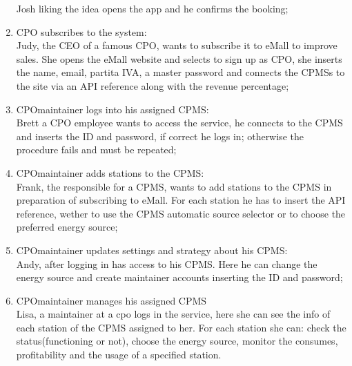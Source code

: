 \begin{enumerate}[label=\textbf{S\arabic*}]
            Josh liking the idea opens the app and he confirms the booking;\label{SCE:user-gets-suggestions}
      \item \ac{CPO} subscribes to the system:\\
            Judy, the CEO of a famous \ac{CPO}, wants to subscribe it to \ac{eMall} to improve sales.
            She opens the eMall website and selects to sign up as \ac{CPO}, she inserts the name, email, \gls{partita IVA}, a master password and connects the \acp{CPMS} to the site via an \ac{API} reference along with the revenue percentage;\label{SCE:cpo-signs-up}
      \item \ac{CPO}maintainer logs into his assigned \ac{CPMS}:\\
            Brett a \ac{CPO} employee wants to access the service, he connects to the \ac{CPMS} and inserts the ID
            and password, if correct he logs in; otherwise the procedure fails and must be repeated;\label{SCE:cpomaintainer-logs-in}
      \item \ac{CPO}maintainer adds stations to the \ac{CPMS}:\\
            Frank, the responsible for a \ac{CPMS}, wants to add stations to the \ac{CPMS} in preparation of subscribing to eMall. For each station he has to insert the \ac{API} reference,
            wether to use the \ac{CPMS} automatic source selector or to choose the preferred energy source;\label{SCE:cpomaintainer-adds-stations}
      \item \ac{CPO}maintainer updates settings and strategy about his \ac{CPMS}:\\
            Andy, after logging in has access to his \ac{CPMS}.
            Here he can change the energy source and create maintainer accounts inserting the ID and password;\label{SCE:cpomaintainer-updates-settings}
      \item \ac{CPO}maintainer manages his assigned \ac{CPMS}\\
            Lisa, a maintainer at a cpo logs in the service, here she can see the info of each station of the \ac{CPMS} assigned to her.
            For each station she can: check the status(functioning or not), choose the energy source, monitor the consumes, profitability and the usage of a specified station.\label{SCE:cpomaintainer-manages}
\end{enumerate}

\clearpage
